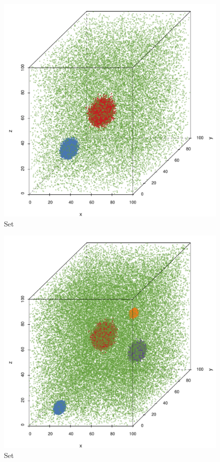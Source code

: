 
\begin{subfigure}{0.23\textwidth}
	\centering
	\includegraphics[width=\textwidth]{experiment/img/datasetplot_ferdosi_2_60000}
	\caption{Set \ferdosiTwo}
	\label{fig:experiment:multisphere:ferdosi2}
\end{subfigure}	
\begin{subfigure}{0.23\textwidth}
	\centering
	\includegraphics[width=\textwidth]{experiment/img/datasetplot_ferdosi_3_120000}
	\caption{Set \ferdosiThree}
	\label{fig:experiment:multisphere:ferdosi3}
\end{subfigure}	
